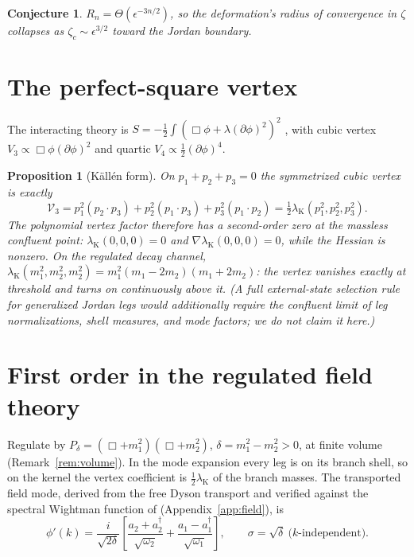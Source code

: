 \documentclass[11pt]{article}
\newtheorem{proposition}[theorem]{Proposition}
\newtheorem{conjecture}[theorem]{Conjecture}
\theoremstyle{definition}
\theoremstyle{remark}
\newcommand{\w}{\omega}
\newcommand{\dg}{\dagger}
\begin{document}
\begin{conjecture}
$R_n=\Theta(\epsilon^{-3n/2})$, so the deformation's radius of
convergence in $\zeta$ collapses as $\zeta_c\sim\epsilon^{3/2}$ toward
the Jordan boundary.
\end{conjecture}

\section{The perfect-square vertex}\label{sec:kallen}

The interacting theory is
$S=-\tfrac12\int(\Box\phi+\lambda(\partial\phi)^2)^2$ \cite{BT2026},
with cubic vertex $V_3\propto\Box\phi(\partial\phi)^2$ and quartic
$V_4\propto\tfrac12(\partial\phi)^4$.

\begin{proposition}[K\"all\'en form]\label{prop:kallen}
On $p_1+p_2+p_3=0$ the symmetrized cubic vertex is exactly
\begin{equation}
\mathcal V_3
=p_1^2(p_2\!\cdot\!p_3)+p_2^2(p_1\!\cdot\!p_3)+p_3^2(p_1\!\cdot\!p_2)
=\tfrac12\lambda_{\mathrm K}(p_1^2,p_2^2,p_3^2).
\end{equation}
The polynomial vertex factor therefore has a \emph{second-order zero at
the massless confluent point}: $\lambda_{\mathrm K}(0,0,0)=0$ and
$\nabla\lambda_{\mathrm K}(0,0,0)=0$, while the Hessian is nonzero.  On
the regulated decay channel,
$\lambda_{\mathrm K}(m_1^2,m_2^2,m_2^2)=m_1^2(m_1-2m_2)(m_1+2m_2)$:
the vertex vanishes exactly at threshold and turns on continuously
above it.  (A full external-state selection rule for generalized Jordan
legs would additionally require the confluent limit of leg
normalizations, shell measures, and mode factors; we do not claim it
here.)
\end{proposition}

\section{First order in the regulated field theory}\label{sec:firstfield}

Regulate by $P_\delta=(\Box+m_1^2)(\Box+m_2^2)$,
$\delta=m_1^2-m_2^2>0$, at finite volume
(Remark~\ref{rem:volume}).  In the mode expansion every leg is on its
branch shell, so on the kernel the vertex coefficient is
$\tfrac12\lambda_{\mathrm K}$ of the branch masses.  The transported
field mode, derived from the free Dyson transport and verified against
the spectral Wightman function of \cite{paperIII}
(Appendix~\ref{app:field}), is
\begin{equation}
\phi'(k)=\frac{i}{\sqrt{2\delta}}
\left[\frac{a_2+a_2^{\dg}}{\sqrt{\w_2}}
+\frac{a_1-a_1^{\dg}}{\sqrt{\w_1}}\right],
\qquad
\sigma=\sqrt\delta\ \text{($k$-independent)}.
\end{equation}
\end{document}
